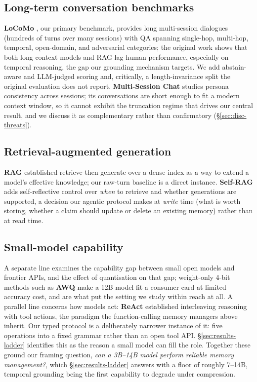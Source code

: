 \subsection{Long-term conversation benchmarks}

\textbf{LoCoMo} \citep{maharana2024locomo}, our primary benchmark, provides long
multi-session dialogues (hundreds of turns over many sessions) with QA spanning
single-hop, multi-hop, temporal, open-domain, and adversarial categories; the
original work shows that both long-context models and RAG lag human performance,
especially on temporal reasoning, the gap our grounding mechanism targets. We
add abstain-aware and LLM-judged scoring and, critically, a
length-invariance split the original evaluation does not report.
\textbf{Multi-Session Chat} \citep{xu2022msc} studies persona
consistency across sessions; its conversations are short enough to fit a modern
context window, so it cannot exhibit the truncation regime that drives our
central result, and we discuss it as complementary rather than confirmatory
(\S\ref{sec:disc-threats}).

\subsection{Retrieval-augmented generation}

\textbf{RAG} \citep{lewis2020rag} established retrieve-then-generate over a dense index
as a way to extend a model's effective knowledge; our raw-turn baseline is a
direct instance. \textbf{Self-RAG} \citep{asai2023selfrag} adds self-reflective control
over \emph{when} to retrieve and whether generations are supported, a decision our
agentic protocol makes at \emph{write} time (what is worth storing, whether a claim
should update or delete an existing memory) rather than at read time.

\subsection{Small-model capability}

A separate line examines the capability gap between small open models and
frontier APIs, and the effect of quantisation on that gap; weight-only 4-bit
methods such as \textbf{AWQ} \citep{lin2023awq} make a 12B model fit a consumer
card at limited accuracy cost, and are what put the setting we study within
reach at all. A parallel line concerns how models act: \textbf{ReAct}
\citep{yao2023react} established interleaving reasoning with tool actions, the
paradigm the function-calling memory managers above inherit. Our typed protocol
is a deliberately narrower instance of it: five operations into a fixed grammar
rather than an open tool API. \S\ref{sec:results-ladder} identifies this as the
reason a small model can fill the role. Together these ground our framing
question, \emph{can a 3B--14B model perform reliable memory management?}, which
\S\ref{sec:results-ladder} answers with a floor of roughly 7--14B, temporal
grounding being the first capability to degrade under compression.

